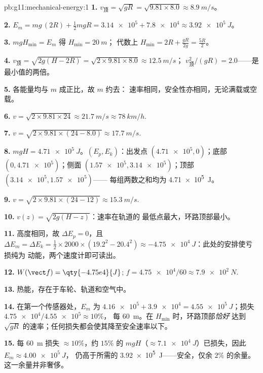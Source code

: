 \begin{solution}{pb:g11:mechanical-energy:1}
\textbf{1.} $v_{\text{顶}} = \sqrt{gR} = \sqrt{9.81 \times 8.0}
\approx \qty{8.9}{m/s}$。

\textbf{2.} $E_m = mg\,(2R) + \tfrac12 m gR = \num{3.14e5} +
\num{7.8e4} \approx \qty{3.92e5}{J}$。

\textbf{3.} $mgH_{\min} = E_m$ 得 $H_{\min} = \qty{20}{m}$；
代数上 $H_{\min} = 2R + \frac{gR}{2g} = \frac{5R}{2}$。

\textbf{4.} $v_{\text{顶}} = \sqrt{2g(H - 2R)} =
\sqrt{2 \times 9.81 \times 8.0} \approx \qty{12.5}{m/s}$；
$v_{\text{顶}}^2/(gR) = 2.0$——是最小值的两倍。

\textbf{5.} 各能量均与 $m$ 成正比，故 $m$ 约去：
速率相同，安全性亦相同，无论满载或空载。

\textbf{6.} $v = \sqrt{2 \times 9.81 \times 24} \approx \qty{21.7}{m/s}
\approx \qty{78}{km/h}$.

\textbf{7.} $v = \sqrt{2 \times 9.81 \times (24 - 8.0)} \approx
\qty{17.7}{m/s}$.

\textbf{8.} $mgH = \qty{4.71e5}{J}$。$(E_p, E_k)$：出发点
$(\num{4.71e5}, 0)$；底部 $(0, \num{4.71e5})$；侧面
$(\num{1.57e5}, \num{3.14e5})$；顶部 $(\num{3.14e5}, \num{1.57e5})$——
每组两数之和均为 \qty{4.71e5}{J}。

\textbf{9.} $v = \sqrt{2 \times 9.81 \times (24 - 12)} \approx
\qty{15.3}{m/s}$.

\textbf{10.} $v(z) = \sqrt{2g(H - z)}$：速率在轨道的
最低点最大，环路顶部最小。

\textbf{11.} 高度相同，故 $\Delta E_p = 0$，且
$\Delta E_m = \Delta E_k = \tfrac12 \times 2000 \times (19.2^2 -
20.4^2) \approx \qty{-4.75e4}{J}$：此处的安排使亏损纯为
动能，两个速度计即可读出。

\textbf{12.} $W(\vect f) = \qty{-4.75e4}{J}$;
$f = \num{4.75e4}/60 \approx \qty{7.9e2}{N}$.

\textbf{13.} 热能，存在于车轮、轨道和空气中。

\textbf{14.} 在第一个传感器处，$E_m$ 为 $\num{4.16e5} + \num{3.9e4} =
\qty{4.55e5}{J}$；损失 $\num{4.75e4}/\num{4.55e5} \approx 10\%$，
每 \qty{60}{m}。在 $H_{\min}$ 时，环路顶部\emph{恰好}
达到 $\sqrt{gR}$ 的速率；任何损失都会使其降至安全速率以下。

\textbf{15.} 每 \qty{60}{m} 损失 $\approx 10\%$，约 $15\%$ 的
$mgH$（$\approx \qty{7.1e4}{J}$）已损失，因此 $E_m \approx \qty{4.00e5}{J}$，
仍高于所需的 \qty{3.92e5}{J}——安全，仅余 $2\%$
的余量。这一余量并非奢侈。


\end{solution}
